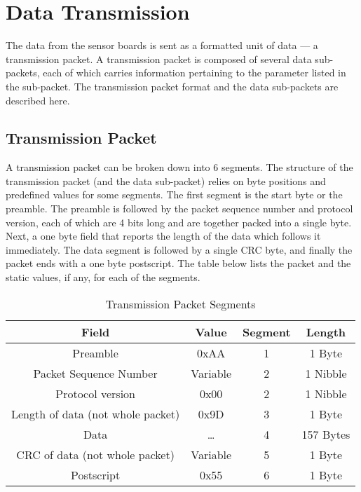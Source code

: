 \section{Data Transmission} \label{section:overall}

The data from the sensor boards is sent as a formatted unit of data --- a transmission
packet. A transmission packet is composed of several data sub-packets, each
of which carries information pertaining to the parameter listed in the sub-packet.
The transmission packet format and the data sub-packets are described here.

\subsection{Transmission Packet}
A transmission packet can be broken down into 6 segments.
The structure of the transmission packet (and the data sub-packet) relies on
byte positions and predefined values for some segments. The first segment
is the start byte or
the preamble. The preamble is followed by the packet sequence number and protocol
version, each of which are 4 bits long and are together packed into a single byte.
Next, a one byte field that reports the length of the data which follows it
immediately. The data segment is
followed by a single CRC byte, and finally the packet ends with a one byte
postscript. The table below lists the packet and the static values, if any,
for each of the segments.

\begin{table}[H]
    \centering
    {
    \begin{tabular}{|c|c|c|c|}
        \hline
        \textbf{Field} & \textbf{Value} & \textbf{Segment} & \textbf{Length}\\
        \hline
        \hline
        Preamble & 0xAA & 1 & 1 Byte\\
        Packet Sequence Number & Variable & 2 & 1 Nibble\\
        Protocol version & 0x00 & 2 & 1 Nibble\\
        Length of data (not whole packet) & 0x9D & 3 & 1 Byte\\
        Data & \dots & 4 & 157 Bytes\\
        CRC of data (not whole packet) & Variable & 5 & 1 Byte\\
        Postscript & 0x55 & 6 & 1 Byte\\
        \hline
    \end{tabular}
    }
    \caption{Transmission Packet Segments}
    \label{table:packsegments}
\end{table}

